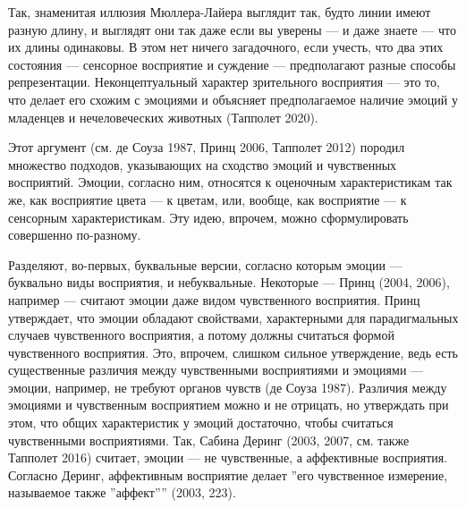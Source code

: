 \documentclass[11pt]{book}
\begin{document}
Так, знаменитая иллюзия Мюллера-Лайера выглядит так, будто линии имеют разную длину, и выглядят они так даже если вы уверены --- и даже знаете --- что их длины одинаковы. В этом нет ничего загадочного, если учесть, что два этих состояния --- сенсорное восприятие и суждение --- предполагают разные способы репрезентации. Неконцептуальный характер зрительного восприятия --- это то, что делает его схожим с эмоциями и объясняет предполагаемое наличие эмоций у младенцев и нечеловеческих животных (Тапполет 2020).

Этот аргумент (см. де Соуза 1987, Принц 2006, Тапполет 2012) породил множество подходов, указывающих на сходство эмоций и чувственных восприятий. Эмоции, согласно ним, относятся к оценочным характеристикам так же, как восприятие цвета --- к цветам, или, вообще, как восприятие --- к сенсорным характеристикам. Эту идею, впрочем, можно сформулировать совершенно по-разному.

Разделяют, во-первых, буквальные версии, согласно которым эмоции --- буквально виды восприятия, и небуквальные. Некоторые --- Принц (2004, 2006), например --- считают эмоции даже видом чувственного восприятия. Принц утверждает, что эмоции обладают свойствами, характерными для парадигмальных случаев чувственного восприятия, а потому должны считаться формой чувственного восприятия. Это, впрочем, слишком сильное утверждение, ведь есть существенные различия между чувственными восприятиями и эмоциями --- эмоции, например, не требуют органов чувств (де Соуза 1987). Различия между эмоциями и чувственным восприятием можно и не отрицать, но утверждать при этом, что общих характеристик у эмоций достаточно, чтобы считаться чувственными восприятиями. Так, Сабина Деринг (2003, 2007, см. также Тапполет 2016) считает, эмоции --- не чувственные, а аффективные восприятия. Согласно Деринг, аффективным восприятие делает ''его чувственное измерение, называемое также ''аффект'''' (2003, 223).
\end{document}
